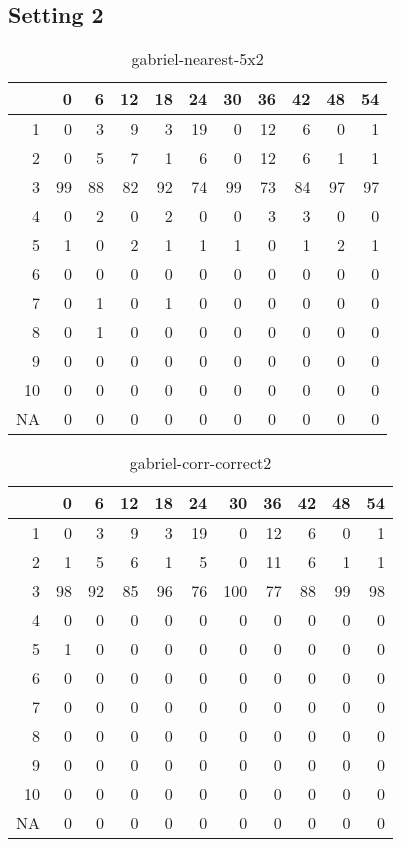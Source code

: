 \documentclass[11pt]{article}
\begin{document}
\subsection*{Setting 2}
\begin{table}[H]
\centering
\begin{tabular}{rrrrrrrrrrr}
  \hline
 & 0 & 6 & 12 & 18 & 24 & 30 & 36 & 42 & 48 & 54 \\ 
  \hline
1 & 0 & 3 & 9 & 3 & 19 & 0 & 12 & 6 & 0 & 1 \\ 
  2 & 0 & 5 & 7 & 1 & 6 & 0 & 12 & 6 & 1 & 1 \\ 
  3 & 99 & 88 & 82 & 92 & 74 & 99 & 73 & 84 & 97 & 97 \\ 
  4 & 0 & 2 & 0 & 2 & 0 & 0 & 3 & 3 & 0 & 0 \\ 
  5 & 1 & 0 & 2 & 1 & 1 & 1 & 0 & 1 & 2 & 1 \\ 
  6 & 0 & 0 & 0 & 0 & 0 & 0 & 0 & 0 & 0 & 0 \\ 
  7 & 0 & 1 & 0 & 1 & 0 & 0 & 0 & 0 & 0 & 0 \\ 
  8 & 0 & 1 & 0 & 0 & 0 & 0 & 0 & 0 & 0 & 0 \\ 
  9 & 0 & 0 & 0 & 0 & 0 & 0 & 0 & 0 & 0 & 0 \\ 
  10 & 0 & 0 & 0 & 0 & 0 & 0 & 0 & 0 & 0 & 0 \\ 
  NA & 0 & 0 & 0 & 0 & 0 & 0 & 0 & 0 & 0 & 0 \\ 
   \hline
\end{tabular}
\caption{gabriel-nearest-5x2} 
\end{table}
\begin{table}[H]
\centering
\begin{tabular}{rrrrrrrrrrr}
  \hline
 & 0 & 6 & 12 & 18 & 24 & 30 & 36 & 42 & 48 & 54 \\ 
  \hline
1 & 0 & 3 & 9 & 3 & 19 & 0 & 12 & 6 & 0 & 1 \\ 
  2 & 1 & 5 & 6 & 1 & 5 & 0 & 11 & 6 & 1 & 1 \\ 
  3 & 98 & 92 & 85 & 96 & 76 & 100 & 77 & 88 & 99 & 98 \\ 
  4 & 0 & 0 & 0 & 0 & 0 & 0 & 0 & 0 & 0 & 0 \\ 
  5 & 1 & 0 & 0 & 0 & 0 & 0 & 0 & 0 & 0 & 0 \\ 
  6 & 0 & 0 & 0 & 0 & 0 & 0 & 0 & 0 & 0 & 0 \\ 
  7 & 0 & 0 & 0 & 0 & 0 & 0 & 0 & 0 & 0 & 0 \\ 
  8 & 0 & 0 & 0 & 0 & 0 & 0 & 0 & 0 & 0 & 0 \\ 
  9 & 0 & 0 & 0 & 0 & 0 & 0 & 0 & 0 & 0 & 0 \\ 
  10 & 0 & 0 & 0 & 0 & 0 & 0 & 0 & 0 & 0 & 0 \\ 
  NA & 0 & 0 & 0 & 0 & 0 & 0 & 0 & 0 & 0 & 0 \\ 
   \hline
\end{tabular}
\caption{gabriel-corr-correct2} 
\end{table}
\end{document}
